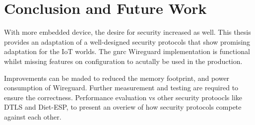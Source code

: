 \chapter{Conclusion and Future Work}
  With more embedded device, the desire for security increased as well. This thesis
  provides an adaptation of a well-designed security protocols that show promising
  adaptation for the IoT worlds. The gnrc Wireguard implementation is functional
  whilst missing features on configuration to acutally be used in the production.

  Improvements can be maded to reduced the memory footprint, and power consumption
  of Wireguard. Further measurement and testing are required to ensure the correctness.
  Performance evaluation vs other security protoocls like DTLS and Diet-ESP, to
  present an overiew of how security protocols compete against each other.